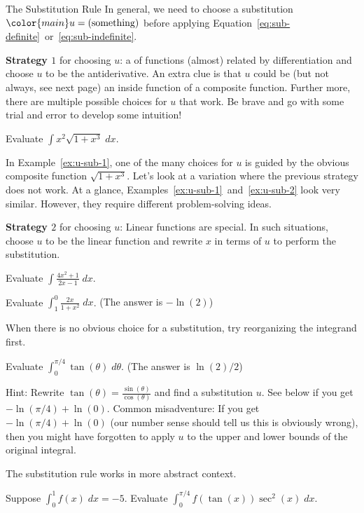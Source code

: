 \documentclass[../main.tex]{subfiles}
\begin{document}
\begin{lesson}{The Substitution Rule}
  In general, we need to choose a substitution \(\color{main} u = (\text{something})\) before applying Equation~\eqref{eq:sub-definite}~or~\eqref{eq:sub-indefinite}.

  \textbf{Strategy \(1\)} for choosing \(u\):  a  of functions (almost) related by differentiation and choose \(u\) to be the antiderivative.  An extra clue is that \(u\) could be (but not always, see next page) an inside function of a composite function. Further more, there are multiple possible choices for \(u\) that work. Be brave and go with some trial and error to develop some intuition!
  \begin{example} \label{ex:u-sub-1}
    Evaluate \(\int x^{2} \sqrt{1 + x^{3}} \;dx\).
  \end{example}
  \clearpage

  In Example~\ref{ex:u-sub-1}, one of the many choices for \(u\) is guided by the obvious composite function \(\sqrt{1 + x^{3}}\). Let's look at a variation where the previous strategy does not work. At a glance, Examples~\ref{ex:u-sub-1}~and~\ref{ex:u-sub-2} look very similar. However, they require different problem-solving ideas.

  \textbf{Strategy \(2\)} for choosing \(u\): Linear functions are special. In such situations, choose \(u\) to be the linear function and rewrite \(x\) in terms of \(u\) to perform the substitution.
  \begin{example} \label{ex:u-sub-2}
    Evaluate \(\int \frac{4x^{2} + 1}{2x - 1} \;dx\).
  \end{example}

  \begin{example}
    Evaluate \(\int_{1}^{0} \frac{2x}{1 + x^{2}} \;dx\). \hfill{}{(The answer is \(-\ln(2)\))}
  \end{example}

  \clearpage
  When there is no obvious choice for a substitution, try reorganizing the integrand first.
  \begin{example}
    Evaluate \(\int_{0}^{\pi/4} \tan(\theta) \;d\theta\). \hfill{}{(The answer is \(\ln(2)/2\))}

    Hint: Rewrite \(\tan(\theta) = \frac{\sin(\theta)}{\cos(\theta)}\) and find a substitution \(u\). See below if you get \(-\ln(\pi/4) + \ln(0)\).
    Common misadventure: If you get \(-\ln(\pi/4) + \ln(0)\) (our number sense should tell us this is obviously wrong), then you might have forgotten to apply \(u\) to the upper and lower bounds of the original integral.
  \end{example}

  \medskip
  The substitution rule works in more abstract context.
  \begin{example}
    Suppose \(\int_{0}^{1} f(x) \;dx = -5\). Evaluate \(\int_{0}^{\pi/4} f(\tan(x)) \sec^{2}(x) \;dx\).
  \end{example}
\end{lesson}
\end{document}
